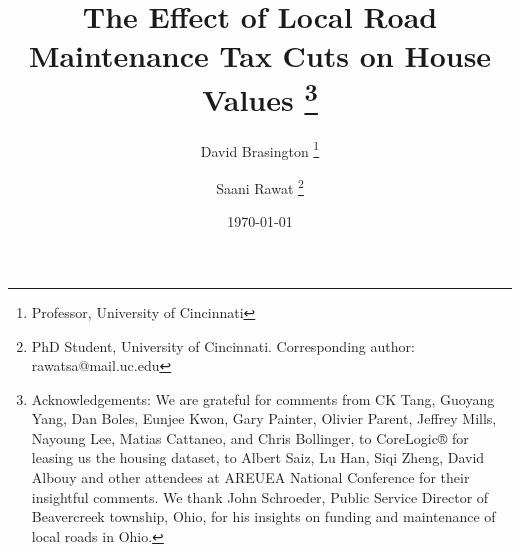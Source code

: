 \documentclass[12pt]{article}
\begin{document}
\begin{titlepage}
\title{The Effect of Local Road Maintenance Tax Cuts on House Values
\thanks{Acknowledgements: We are grateful for comments from CK Tang, Guoyang Yang, Dan Boles, Eunjee Kwon, Gary Painter, Olivier Parent, Jeffrey Mills, Nayoung Lee, Matias Cattaneo, and Chris Bollinger, to CoreLogic® for leasing us the housing dataset, to Albert Saiz, Lu Han, Siqi Zheng, David Albouy and other attendees at AREUEA National Conference for their insightful comments. We thank John Schroeder, Public Service Director of Beavercreek township, Ohio, for his insights on funding and maintenance of local roads in Ohio.}}
\author{David Brasington \thanks{Professor, University of Cincinnati} \and Saani Rawat \thanks{PhD Student, University of Cincinnati. Corresponding author: rawatsa@mail.uc.edu}}
\date{\today} 
\maketitle



\end{titlepage}
\end{document}

